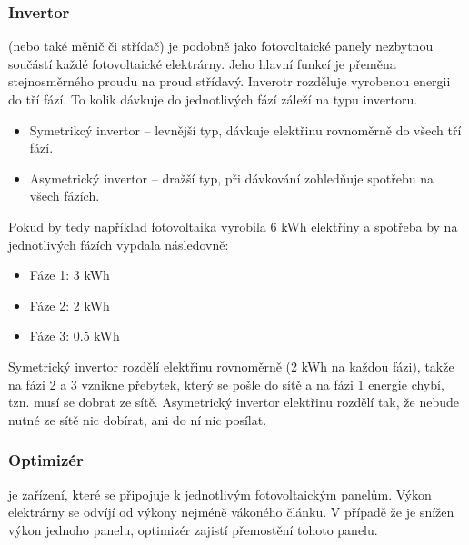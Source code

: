 

\subsubsection{Invertor}

(nebo také měnič či střídač) je podobně jako fotovoltaické panely
nezbytnou součástí každé fotovoltaické elektrárny.
Jeho hlavní funkcí je přeměna stejnosměrného proudu na proud střídavý.
Inverotr rozděluje vyrobenou energii do tří fází. To kolik dávkuje do jednotlivých fází záleží na typu invertoru.

\begin{itemize}
    \item Symetrikcý invertor -- levnější typ, dávkuje elektřinu rovnoměrně do všech tří fází.
    \item Asymetrický invertor -- dražší typ, při dávkování zohledňuje spotřebu na všech fázích.
\end{itemize}

Pokud by tedy například fotovoltaika vyrobila 6 \si{\kWh} elektřiny a spotřeba by na jednotlivých fázích vypdala následovně:

\begin{itemize}
    \item Fáze 1: 3 \si{\kWh}
    \item Fáze 2: 2 \si{\kWh}
    \item Fáze 3: 0.5 \si{\kWh}
\end{itemize}

Symetrický invertor rozdělí elektřinu rovnoměrně (2 \si{\kWh} na každou fázi), takže na fázi 2 a 3 vznikne přebytek, který se pošle do sítě a na fázi 1 energie chybí, tzn. musí se dobrat ze sítě.
Asymetrický invertor elektřinu rozdělí tak, že nebude nutné ze sítě nic dobírat, ani do ní nic posílat.  

\subsubsection{Optimizér}
je zařízení, které se připojuje k jednotlivým fotovoltaickým panelům. Výkon elektrárny se odvíjí od výkony nejméně vákoného článku.
V případě že je snížen výkon jednoho panelu, optimizér zajistí přemostění tohoto panelu.


